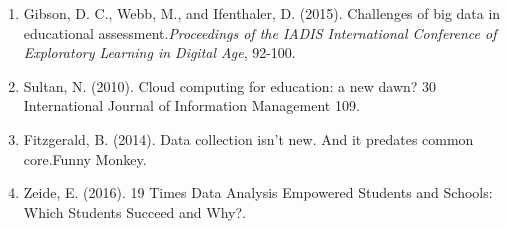 \documentclass{article}
\begin{document}
\begin{enumerate}
    \label{sec:12}
    \item Gibson, D. C., Webb, M., and Ifenthaler, D. (2015). Challenges of big data in educational assessment.\textit{Proceedings of the IADIS International Conference of Exploratory Learning in Digital Age}, 92-100.
    \label{sec:13}
    \item Sultan, N. (2010). Cloud computing for education: a new dawn? 30 International Journal of Information Management  109.
    \label{sec:14}
    \item Fitzgerald, B. (2014). Data collection isn't new. And it predates common core.Funny Monkey.
    \label{sec:15}
    \item Zeide, E. (2016). 19 Times Data Analysis Empowered Students and Schools: Which Students Succeed and Why?.
\end{enumerate}
\end{document}
